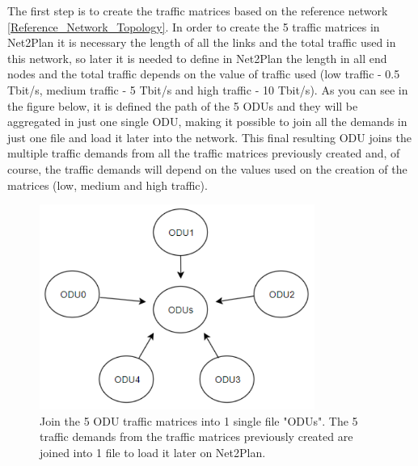 \noindent
The first step is to create the traffic matrices based on the reference network \ref{Reference_Network_Topology}. In order to create the 5 traffic matrices in Net2Plan it is necessary the length of all the links and the total traffic used in this network, so later it is needed to define in Net2Plan the length in all end nodes and the total traffic depends on the value of traffic used (low traffic - 0.5 Tbit/s, medium traffic - 5 Tbit/s and high traffic - 10 Tbit/s). As you can see in the figure below, it is defined the path of the 5 ODUs and they will be aggregated in just one single ODU, making it possible to join all the demands in just one file and load it later into the network. This final resulting ODU joins the multiple traffic demands from all the traffic matrices previously created and, of course, the traffic demands will depend on the values used on the creation of the matrices (low, medium and high traffic).

\begin{figure}[H]
\centering
\includegraphics[width=9cm]{sdf/heuristic/translucent_protection/figures/join_matrices_odus}
\caption{Join the 5 ODU traffic matrices into 1 single file "ODUs". The 5 traffic demands from the traffic matrices previously created are joined into 1 file to load it later on Net2Plan.}
\label{join_matrices_odus_protec}
\end{figure}

